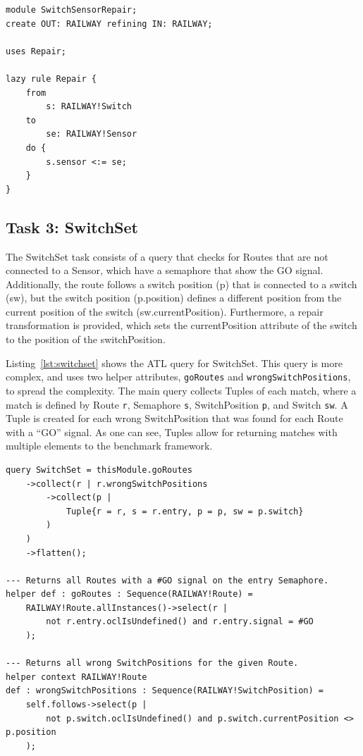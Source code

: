 \documentclass[submission,copyright,creativecommons]{eptcs}
\begin{document}
\lstset{language=atl}
\begin{lstlisting}[float=htb, caption={SwitchSensor repair transformation module in ATL}, label=lst:switchsensorrepair, captionpos=b, frame=tb, belowskip=-10pt]
module SwitchSensorRepair;
create OUT: RAILWAY refining IN: RAILWAY;

uses Repair;

lazy rule Repair {
	from
		s: RAILWAY!Switch
	to
		se: RAILWAY!Sensor
	do {
		s.sensor <:= se;
	}
}
\end{lstlisting}

\subsection{Task 3: SwitchSet}

The SwitchSet task consists of a query that checks for Routes that are not connected to a Sensor, which have a semaphore that show the GO signal. Additionally, the route follows a switch position (p) that is connected to a switch (sw), but the switch position (p.position) defines a different position from the current position of the switch (sw.currentPosition). Furthermore, a repair transformation is provided, which sets the currentPosition attribute of the switch to the position of the switchPosition. 

Listing~\ref{lst:switchset} shows the ATL query for SwitchSet. This query is more complex, and uses two helper attributes, \texttt{goRoutes} and \texttt{wrongSwitchPositions}, to spread the complexity. The main query collects Tuples of each match, where a match is defined by Route \texttt{r}, Semaphore \texttt{s}, SwitchPosition \texttt{p}, and Switch \texttt{sw}. A Tuple is created for each wrong SwitchPosition that was found for each Route with a ``GO'' signal. As one can see, Tuples allow for returning matches with multiple elements to the benchmark framework.

\lstset{language=atl}
\begin{lstlisting}[float=htb, caption={SwitchSet query in ATL}, label=lst:switchset, captionpos=b, frame=tb, belowskip=-10pt]
query SwitchSet = thisModule.goRoutes
	->collect(r | r.wrongSwitchPositions
		->collect(p | 
			Tuple{r = r, s = r.entry, p = p, sw = p.switch}
		)
	)
	->flatten();

--- Returns all Routes with a #GO signal on the entry Semaphore.
helper def : goRoutes : Sequence(RAILWAY!Route) =
	RAILWAY!Route.allInstances()->select(r | 
		not r.entry.oclIsUndefined() and r.entry.signal = #GO
	);

--- Returns all wrong SwitchPositions for the given Route.
helper context RAILWAY!Route 
def : wrongSwitchPositions : Sequence(RAILWAY!SwitchPosition) =
	self.follows->select(p | 
		not p.switch.oclIsUndefined() and p.switch.currentPosition <> p.position
	);
\end{lstlisting}
\end{document}
